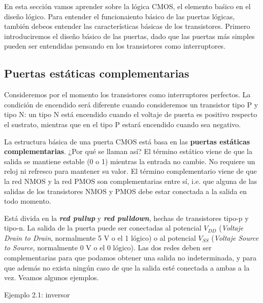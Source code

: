 En esta sección vamos aprender sobre la lógica CMOS, el elemento baśico en el diseño lógico. Para entender el funcionaiento básico de las puertas lógicas, también debeos entender las características básicas de los transistores. Primero introduciremos el diseño básico de las puertas, dado que las puertas más simples pueden ser entendidas pensando en los transistores como interruptores. 

\subsection{Puertas estáticas complementarias}

Consideremos por el momento los transistores como interruptores perfectos. La condición de encendido será diferente cuando consideremos un transistor tipo P y tipo N: un tipo N está encendido cuando el voltaje de puerta es positivo respecto el sustrato, mientras que en el tipo P estará encendido cuando sea negativo. 

La estructura básica de una puerta CMOS está basa en las \textbf{puertas estáticas complementarias}. ¿Por qué se llaman así? El término estático viene de que la salida se mantiene estable (0 o 1) mientras la entrada no cambie. No requiere un reloj ni refresco para mantener su valor. El término complementario viene de que la red NMOS y la red PMOS son complementarias entre sí, i.e. que alguna de las salidas de los transistores NMOS y PMOS debe estar conectada a la salida en todo momento. 

Está divida en la \textbf{\textit{red pullup}} y \textbf{\textit{red pulldown}}, hechas de transistores tipo-p y tipo-n. La salida de la puerta puede ser conectadas al potencial $V_{DD}$ (\textit{Voltaje Drain to Drain}, normalmente 5 V o el 1 lógico) o al potencial $V_{SS}$ (\textit{Voltaje Source to Source}, normalmente 0 V o el 0 lógico). Las dos redes deben ser complementarias para que podamos obtener una salida no indeterminada, y para que además no exista ningún caso de que la salida esté conectada a ambas a la vez. Veamos algunos ejemplos. 

\begin{Ejemplo}
    Ejemplo 2.1: inversor
\end{Ejemplo}

